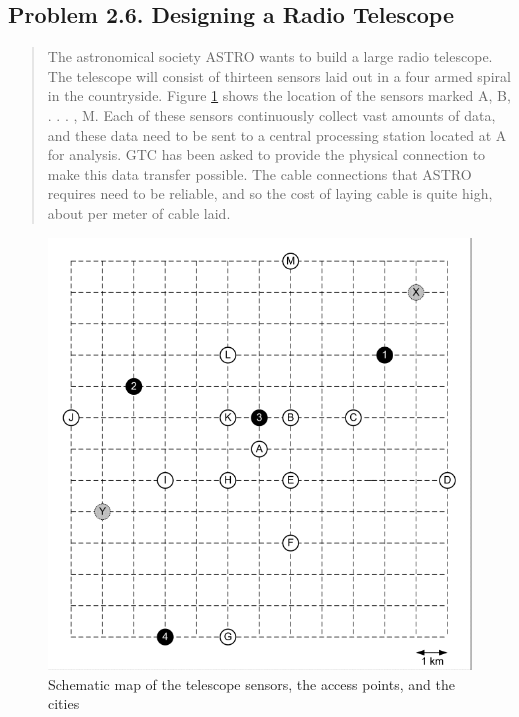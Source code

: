 \subsection{Problem 2.6. Designing a Radio Telescope}
\begin{quote}
The astronomical society ASTRO wants to build a large radio telescope. The telescope
will consist of thirteen sensors laid out in a four armed spiral in the countryside.
Figure \ref{map2-6} shows the location of the sensors marked A, B, . . . , M. Each of
these sensors continuously collect vast amounts of data, and these data need to be
sent to a central processing station located at A for analysis. GTC has been asked to
provide the physical connection to make this data transfer possible. The cable connections
that ASTRO requires need to be reliable, and so the cost of laying cable is
quite high, about  per meter of cable laid.
\end{quote}

\begin{figure}[H]
	\centering
	\includegraphics[scale=0.5]{./img/map2-6.png}
	\caption{Schematic map of the telescope sensors, the access points, and the cities}
	\label{map2-6}
\end{figure}

